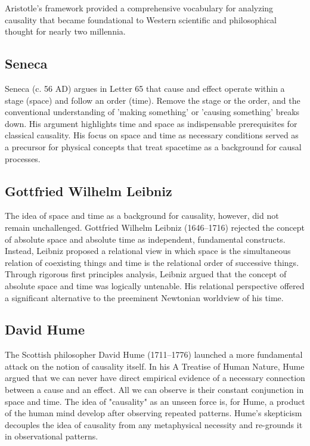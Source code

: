 Aristotle’s framework provided a comprehensive vocabulary for analyzing causality that became foundational to Western scientific and philosophical thought for nearly two millennia.

\subsection{Seneca}
\label{sec:history_seneca}

Seneca (c. 56 AD) argues in Letter 65\cite{SenecaLetters} that cause and effect operate within a stage (space) and follow an order (time). Remove the stage or the order, and the conventional understanding of 'making something' or 'causing something' breaks down. His argument highlights time and space as indispensable prerequisites for classical causality. His focus on space and time as necessary conditions served as a precursor for physical concepts that treat spacetime as a background for causal processes.

\subsection{Gottfried Wilhelm Leibniz}
\label{sec:history_leibniz}

The idea of space and time as a background for causality, however, did not remain unchallenged. Gottfried Wilhelm Leibniz (1646--1716) rejected the concept of absolute space and absolute time as independent, fundamental constructs. Instead, Leibniz proposed\cite{LeibnizPhysicsSEP} a relational view in which space is the simultaneous relation of coexisting things and time is the relational order of successive things. Through rigorous first principles analysis, Leibniz argued that the concept of absolute space and time was logically untenable. His relational perspective offered a significant alternative to the preeminent Newtonian worldview of his time.

\subsection{David Hume}
\label{sec:history_hume}

The Scottish philosopher David Hume (1711–1776) launched a more fundamental attack on the notion of causality itself. In his A Treatise of Human Nature\cite{hume2000treatise}, Hume argued that we can never have direct empirical evidence of a necessary connection between a cause and an effect. All we can observe is their constant conjunction in space and time. The idea of "causality" as an unseen force is, for Hume, a product of the human mind develop after observing repeated patterns. Hume's skepticism decouples the idea of causality from any metaphysical necessity and re-grounds it in observational patterns\cite{hume2000treatise}.

